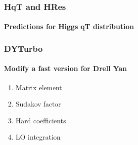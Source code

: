 \documentclass[aspectratio=43]{beamer}
\begin{document}
\begin{frame}


\end{frame}

\begin{frame}

	\frametitle{HqT and HRes}
	\framesubtitle{Predictions for Higgs qT distribution}
	
\end{frame}

\begin{frame}

	\frametitle{DYTurbo}
	\framesubtitle{Modify a fast version for Drell Yan}

	\begin{enumerate}
		\item Matrix element
		\item Sudakov factor
		\item Hard coefficients
		\item LO integration
	\end{enumerate}

\end{frame}
\end{document}
